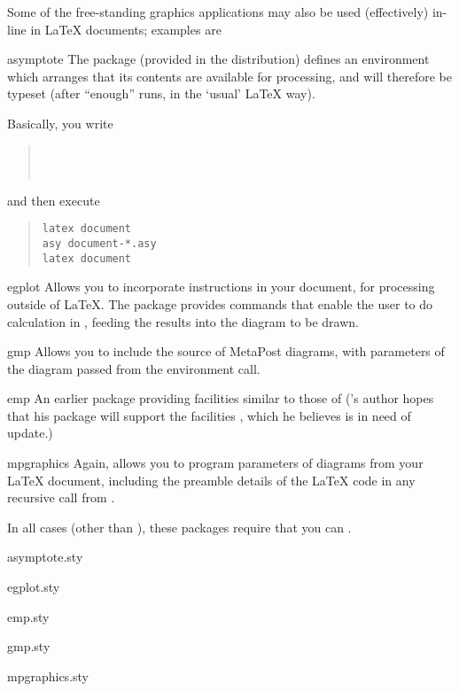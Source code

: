 
Some of the free-standing graphics applications may also be used
(effectively) in-line in \LaTeX{} documents; examples are
\begin{booklist}
\item[asymptote]The package  (provided in the
   distribution) defines an environment
   which arranges that its contents are available for
  processing, and will therefore be typeset (after ``enough'' runs, in
  the `usual' \LaTeX{} way).

  Basically, you write
  \begin{quote}
    \\
    \latexhtml{\hspace*{1em}}{~~}\texttt{}\\
  \end{quote}
  and then execute
\begin{quote}
\begin{verbatim}
latex document
asy document-*.asy
latex document
\end{verbatim}
\end{quote}
\item[egplot]Allows you to incorporate 
  instructions in your document, for processing outside of \LaTeX{}.
  The package provides commands that enable the user to do calculation
  in , feeding the results into the diagram
  to be drawn.
\item[gmp]Allows you to include the source of MetaPost diagrams, with
  parameters of the diagram passed from the environment call.
\item[emp]An earlier package providing facilities similar to those of
   ('s author hopes that his package will
  support the facilities , which he believes is in need
  of update.)
\item[mpgraphics]Again, allows you to program parameters of \MP{}
  diagrams from your \LaTeX{} document, including the preamble details
  of the \LaTeX{} code in any recursive call from \MP{}.
\end{booklist}
In all cases (other than ), these packages require
that you can %
.
\begin{ctanrefs}
\item[asymptote.sty]
\item[egplot.sty]
\item[emp.sty]
\item[gmp.sty]
\item[mpgraphics.sty]
\end{ctanrefs}

